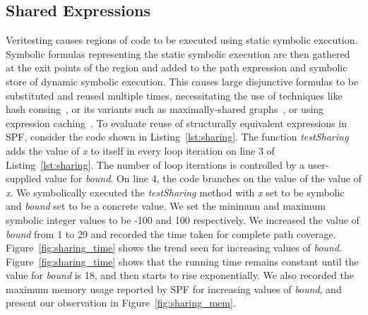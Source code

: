 \subsection{Shared Expressions}

%
Veritesting causes regions of code to be executed using static symbolic execution.
%
Symbolic formulas representing the static symbolic execution are then gathered at the exit points of the region and added to the path expression and symbolic store of dynamic symbolic execution.
%
This causes large disjunctive formulas to be substituted and reused multiple times, necessitating the use of techniques like hash consing~\cite{hashconsing}, or its variants such as maximally-shared graphs~\cite{babic}, or using expression caching~\cite{green}.
%
To evaluate reuse of structurally equivalent expressions in SPF, consider the code shown in Listing~\ref{lst:sharing}.
%
The function \textit{testSharing} adds the value of \textit{x} to itself in every loop iteration on line 3 of Listing~\ref{lst:sharing}.
%
The number of loop iterations is controlled by a user-supplied value for \textit{bound}.
%
On line 4, the code branches on the value of the value of \textit{x}.
%
We symbolically executed the \textit{testSharing} method with \textit{x} set to be symbolic and \textit{bound} set to be a concrete value.
%
We set the minimum and maximum symbolic integer values to be -100 and 100 respectively.
%
We increased the value of \textit{bound} from 1 to 29 and recorded the time taken for complete path coverage.
%
Figure~\ref{fig:sharing_time} shows the trend seen for increasing values of \textit{bound}.
%
Figure~\ref{fig:sharing_time} shows that the running time remains constant until the value for \textit{bound} is 18, and then starts to rise exponentially.
%
We also recorded the maximum memory usage reported by SPF for increasing values of \textit{bound}, and present our observation in Figure~\ref{fig:sharing_mem}.

